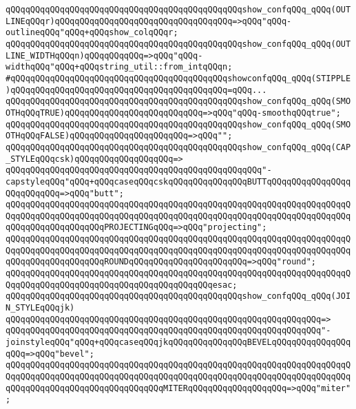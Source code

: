 \verb|qQQqqQQqqQQqqQQqqQQqqQQqqQQqqQQqqQQqqQQqqQQqqQQqshow_confqQQq_qQQq(OUTLINEqQQqr)qQQqqQQqqQQqqQQqqQQqqQQqqQQqqQQqqQQq=>qQQq"qQQq-outlineqQQq"qQQq+qQQqshow_colqQQqr;|\newline
\verb|qQQqqQQqqQQqqQQqqQQqqQQqqQQqqQQqqQQqqQQqqQQqqQQqshow_confqQQq_qQQq(OUTLINE_WIDTHqQQqn)qQQqqQQqqQQq=>qQQq"qQQq-widthqQQq"qQQq+qQQqstring_util::from_intqQQqn;|\newline
\verb|#qQQqqQQqqQQqqQQqqQQqqQQqqQQqqQQqqQQqqQQqqQQqshowconfqQQq_qQQq(STIPPLE)qQQqqQQqqQQqqQQqqQQqqQQqqQQqqQQqqQQqqQQqqQQq=qQQq...|\newline
\verb|qQQqqQQqqQQqqQQqqQQqqQQqqQQqqQQqqQQqqQQqqQQqqQQqshow_confqQQq_qQQq(SMOOTHqQQqTRUE)qQQqqQQqqQQqqQQqqQQqqQQqqQQq=>qQQq"qQQq-smoothqQQqtrue";|\newline
\verb|qQQqqQQqqQQqqQQqqQQqqQQqqQQqqQQqqQQqqQQqqQQqqQQqshow_confqQQq_qQQq(SMOOTHqQQqFALSE)qQQqqQQqqQQqqQQqqQQqqQQq=>qQQq"";|\newline
\verb|qQQqqQQqqQQqqQQqqQQqqQQqqQQqqQQqqQQqqQQqqQQqqQQqshow_confqQQq_qQQq(CAP_STYLEqQQqcsk)qQQqqQQqqQQqqQQqqQQq=>|\newline
\verb|qQQqqQQqqQQqqQQqqQQqqQQqqQQqqQQqqQQqqQQqqQQqqQQqqQQq"-capstyleqQQq"qQQq+qQQqcaseqQQqcskqQQqqQQqqQQqqQQqBUTTqQQqqQQqqQQqqQQqqQQqqQQqqQQq=>qQQq"butt";|\newline
\verb|qQQqqQQqqQQqqQQqqQQqqQQqqQQqqQQqqQQqqQQqqQQqqQQqqQQqqQQqqQQqqQQqqQQqqQQqqQQqqQQqqQQqqQQqqQQqqQQqqQQqqQQqqQQqqQQqqQQqqQQqqQQqqQQqqQQqqQQqqQQqqQQqqQQqqQQqqQQqqQQqPROJECTINGqQQq=>qQQq"projecting";|\newline
\verb|qQQqqQQqqQQqqQQqqQQqqQQqqQQqqQQqqQQqqQQqqQQqqQQqqQQqqQQqqQQqqQQqqQQqqQQqqQQqqQQqqQQqqQQqqQQqqQQqqQQqqQQqqQQqqQQqqQQqqQQqqQQqqQQqqQQqqQQqqQQqqQQqqQQqqQQqqQQqqQQqROUNDqQQqqQQqqQQqqQQqqQQqqQQq=>qQQq"round";|\newline
\verb|qQQqqQQqqQQqqQQqqQQqqQQqqQQqqQQqqQQqqQQqqQQqqQQqqQQqqQQqqQQqqQQqqQQqqQQqqQQqqQQqqQQqqQQqqQQqqQQqqQQqqQQqqQQqqQQqesac;|\newline
\newline
\verb|qQQqqQQqqQQqqQQqqQQqqQQqqQQqqQQqqQQqqQQqqQQqqQQqshow_confqQQq_qQQq(JOIN_STYLEqQQqjk)|\newline
\verb|qQQqqQQqqQQqqQQqqQQqqQQqqQQqqQQqqQQqqQQqqQQqqQQqqQQqqQQqqQQqqQQq=>|\newline
\verb|qQQqqQQqqQQqqQQqqQQqqQQqqQQqqQQqqQQqqQQqqQQqqQQqqQQqqQQqqQQqqQQq"-joinstyleqQQq"qQQq+qQQqcaseqQQqjkqQQqqQQqqQQqqQQqBEVELqQQqqQQqqQQqqQQqqQQq=>qQQq"bevel";|\newline
\verb|qQQqqQQqqQQqqQQqqQQqqQQqqQQqqQQqqQQqqQQqqQQqqQQqqQQqqQQqqQQqqQQqqQQqqQQqqQQqqQQqqQQqqQQqqQQqqQQqqQQqqQQqqQQqqQQqqQQqqQQqqQQqqQQqqQQqqQQqqQQqqQQqqQQqqQQqqQQqqQQqqQQqqQQqqQQqMITERqQQqqQQqqQQqqQQqqQQq=>qQQq"miter";|\newline
